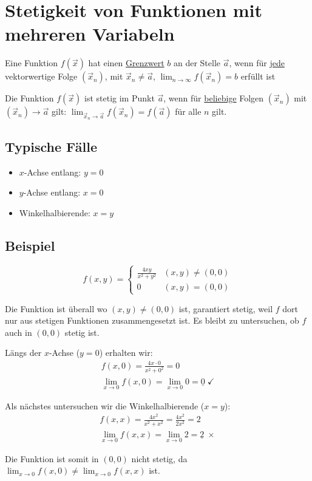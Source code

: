 \section{Stetigkeit von Funktionen mit mehreren Variabeln}
\begin{definition}[Grenzwert]
Eine Funktion $f(\vec{x})$ hat einen \underline{Grenzwert} $b$ an der Stelle
$\vec{a}$, wenn für \underline{jede} vektorwertige Folge $(\vec{x}_n)$,
mit $\vec{x}_n \neq \vec{a}$, $\lim_{n \to \infty}f(\vec{x}_n) = b$ erfüllt ist
\end{definition}
\begin{definition}[Stetigkeit]
Die Funktion $f(\vec{x})$ ist stetig im Punkt $\vec{a}$, wenn für
\underline{beliebige} Folgen $(\vec{x}_n)$ mit
$(\vec{x}_n) \to \vec{a}$ gilt: $\lim_{\vec{x}_n \to \vec{a}} f(\vec{x}_n) = f(\vec{a})$
für alle $n$ gilt.
\end{definition}

\subsection{Typische Fälle}
\begin{itemize}
	\item $x$-Achse entlang: $y = 0$
	\item $y$-Achse entlang: $x = 0$
	\item Winkelhalbierende: $x = y$
\end{itemize}

\subsection*{Beispiel}
\[
f(x, y) = \begin{cases}
	\frac{4xy}{x^2 + y^2} & (x,y) \neq (0,0)\\
	0 & (x,y) = (0,0)
\end{cases}
\]

Die Funktion ist überall wo $(x, y) \neq (0,0)$ ist, garantiert stetig, weil $f$ dort nur aus stetigen Funktionen zusammengesetzt ist. Es bleibt zu untersuchen, ob $f$ auch in $(0,0)$ stetig ist.

Längs der $x$-Achse ($y = 0$) erhalten wir:
\begin{align*}
f(x, 0) = \frac{4x \cdot 0}{x^2 + 0^2} = 0\\
\lim_{x \to 0} f(x, 0) = \lim_{x \to 0} 0 = \underline{0} \; \checkmark
\end{align*}

Als nächstes untersuchen wir die Winkelhalbierende ($x = y$):
\begin{align*}
f(x, x) = \frac{4x^2}{x^2 + x^2} = \frac{4x^2}{2x^2} = 2\\
\lim_{x \to 0} f(x, x) = \lim_{x \to 0} 2 = \underline{2} \; \times
\end{align*}

Die Funktion ist somit in $(0,0)$ nicht stetig, da
$\lim_{x \to 0} f(x, 0) \neq \lim_{x \to 0} f(x, x)$ ist.